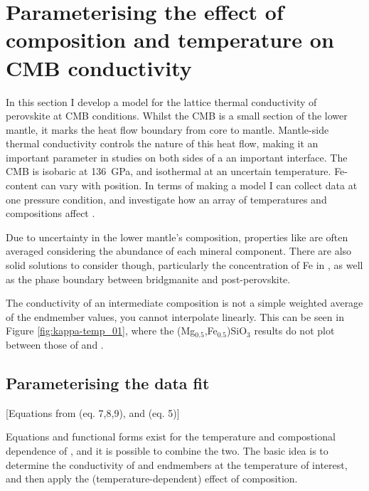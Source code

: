 \section{Parameterising the effect of composition and temperature on CMB conductivity}

In this section I develop a model for the lattice thermal conductivity of \mgfesios perovskite at CMB conditions. Whilst the CMB is a small section of the lower mantle, it marks the heat flow boundary from core to mantle. Mantle-side thermal conductivity controls the nature of this heat flow, making it an important parameter in studies on both sides of a an important interface. The CMB is isobaric at 136~GPa, and isothermal at an uncertain temperature. Fe-content can vary with position. In terms of making a model I can collect data at one pressure condition, and investigate how an array of temperatures and compositions affect \tc.

Due to uncertainty in the lower mantle's composition, properties like \tcs are often averaged considering the abundance of each mineral component. There are also solid solutions to consider though, particularly the concentration of Fe in \mgsio, as well as the phase boundary between bridgmanite and \mgsios post-perovskite. 

The conductivity of an intermediate composition is not a simple weighted average of the endmember values, you cannot interpolate linearly. This can be seen in Figure \ref{fig:kappa-temp_01}, where the (Mg$_{0.5}$,Fe$_{0.5}$)SiO$_3$ results do not plot between those of \mgsios and \fesio.




\subsection{Parameterising the data fit} 

[Equations from \cite{Ohta2017} (eq. 7,8,9), and \cite{Okuda2017} (eq. 5)]

Equations and functional forms exist for the temperature and compostional dependence of \tc, and it is possible to combine the two. The basic idea is to determine the conductivity of \mgsios and \fesios endmembers at the temperature of interest, and then apply the (temperature-dependent) effect of composition.

